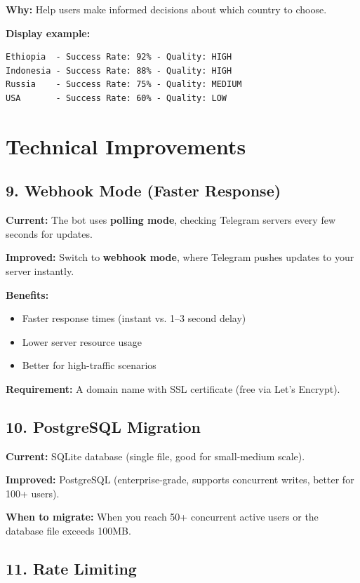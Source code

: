 \textbf{Why:} Help users make informed decisions about which country to choose.

\textbf{Display example:}
\begin{lstlisting}[style=bashstyle]
Ethiopia  - Success Rate: 92% - Quality: HIGH
Indonesia - Success Rate: 88% - Quality: HIGH  
Russia    - Success Rate: 75% - Quality: MEDIUM
USA       - Success Rate: 60% - Quality: LOW
\end{lstlisting}

\section{Technical Improvements}

\subsection{9. Webhook Mode (Faster Response)}

\textbf{Current:} The bot uses \textbf{polling mode}, checking Telegram servers every few seconds for updates.

\textbf{Improved:} Switch to \textbf{webhook mode}, where Telegram pushes updates to your server instantly.

\textbf{Benefits:}
\begin{itemize}
    \item Faster response times (instant vs. 1--3 second delay)
    \item Lower server resource usage
    \item Better for high-traffic scenarios
\end{itemize}

\textbf{Requirement:} A domain name with SSL certificate (free via Let's Encrypt).

\subsection{10. PostgreSQL Migration}

\textbf{Current:} SQLite database (single file, good for small-medium scale).

\textbf{Improved:} PostgreSQL (enterprise-grade, supports concurrent writes, better for 100+ users).

\textbf{When to migrate:} When you reach 50+ concurrent active users or the database file exceeds 100MB.

\subsection{11. Rate Limiting}


